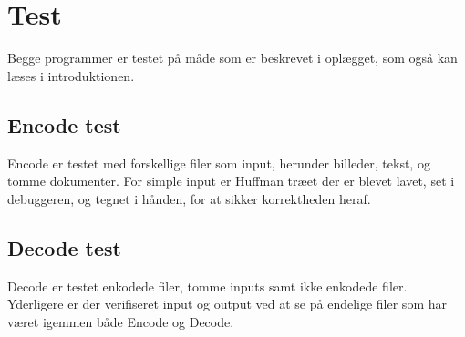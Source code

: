 \documentclass{article}
\begin{document}
\section*{Test}
Begge programmer er testet på måde som er beskrevet i oplægget, som også kan læses i introduktionen.
\subsection*{Encode test}
Encode er testet med forskellige filer som input, herunder billeder, tekst, og tomme dokumenter.
For simple input er Huffman træet der er blevet lavet, set i debuggeren, og tegnet i hånden, for at sikker korrektheden heraf.
\subsection*{Decode test}
Decode er testet enkodede filer, tomme inputs samt ikke enkodede filer.
Yderligere er der verifiseret input og output ved at se på endelige filer som har været igemmen både Encode og Decode.
\end{document}
